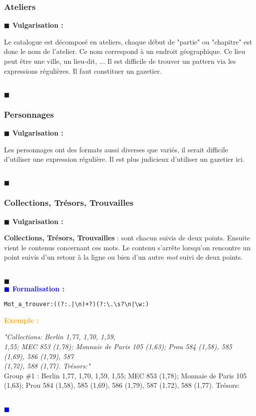 \documentclass[a4paper, 11pt]{article}
\newenvironment{vulgarisation}
    {
    \textbf{\textcolor{dark-blue}{$\blacksquare$  Vulgarisation : \\}}

    }
    {
    ~\\\textcolor{dark-blue}{$\blacksquare$}\\
    }
\newenvironment{formalisation}
    {
    \textbf{\textcolor{blue}{$\blacksquare$  Formalisation : \\}}
    }
    {
    ~\\\textcolor{blue}{$\blacksquare$}\\
    }
\newenvironment{exemple}
    {
    \textbf{\textcolor{orange}{
    Exemple : \\}}
    }
    {\\
    }
\begin{document}
\subsubsection{Ateliers}
\begin{vulgarisation}
Le catalogue est décomposé en ateliers, chaque début de "partie" ou "chapitre" est donc le nom de l'atelier. Ce nom correspond à un endroit géographique. Ce lieu peut être une ville, un lieu-dit, ... Il est difficile de trouver un pattern via les expressions régulières. Il faut constituer un gazetier.
\end{vulgarisation}

\subsubsection{Personnages}
\begin{vulgarisation}
Les personnages ont des formats aussi diverses que variés, il serait difficile d'utiliser une expression régulière. Il est plus judicieux d'utiliser un gazetier ici. 
\end{vulgarisation}

\subsubsection{Collections, Trésors, Trouvailles}
\begin{vulgarisation}
\textbf{Collections, Trésors, Trouvailles} : sont chacun suivis de deux points. Ensuite vient le contenus concernant ces mots. Le contenu s'arrête lorsqu'on rencontre un point suivis d'un retour à la ligne ou bien d'un autre \textit{mot} suivi de deux points.
\end{vulgarisation}
\begin{formalisation}
\begin{verbatim}
Mot_a_trouver:((?:.|\n)+?)(?:\.\s?\n|\w:)
\end{verbatim}
\begin{exemple}
\emph{"Collections: Berlin 1,77, 1,70, 1,59, \\
        1,55; MEC 853 (1,78); Monnaie de Paris 105 (1,63); Prou 584 (1,58), 585 (1,69), 586 (1,79), 587 \\
        (1,72), 588 (1,77). Trésors:"}\\
Group \#1 :  Berlin 1,77, 1,70, 1,59,
        1,55; MEC 853 (1,78); Monnaie de Paris 105 (1,63); Prou 584 (1,58), 585 (1,69), 586 (1,79), 587 (1,72), 588 (1,77). Trésors:
\end{exemple}
\end{formalisation}
\end{document}
